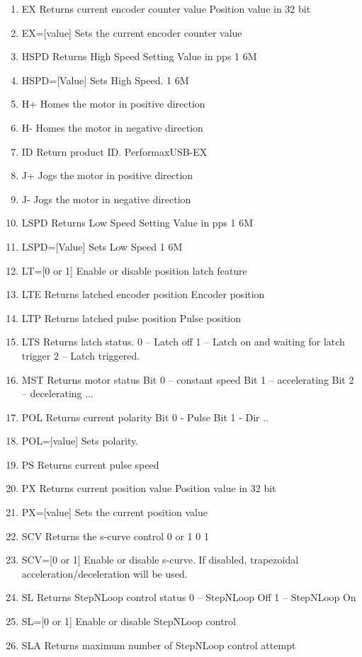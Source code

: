 \documentclass[10pt,letter,twoside]{report}
\begin{document}
\begin{itemize}
\begin{enumerate}
\item EX	Returns current encoder counter value	Position value in 32 bit 		
\item EX=[value]	Sets the current encoder counter value			
\item HSPD	Returns High Speed Setting	Value in pps	1	6M
\item HSPD=[Value] 	Sets High Speed.		1	6M
\item H+	Homes the motor in positive direction			
\item H-	Homes the motor in negative direction			
\item ID	Return product ID. 	PerformaxUSB-EX		
\item J+	Jogs the motor in positive direction			
\item J-	Jogs the motor in negative direction			
\item LSPD	Returns Low Speed Setting	Value in pps	1	6M
\item LSPD=[Value] 	Sets Low Speed		1	6M
\item LT=[0 or 1]	Enable or disable position latch feature			
\item LTE	Returns latched encoder position	Encoder position		
\item LTP	Returns latched pulse position	Pulse position		
\item LTS	Returns latch status.	0 – Latch off 1 – Latch on and waiting for latch trigger 2 – Latch triggered.		
\item MST	Returns motor status	Bit 0 – constant speed Bit 1 – accelerating Bit 2 – decelerating ...
\item POL	Returns current polarity	Bit 0 - Pulse Bit 1 - Dir  ..
\item POL=[value]	Sets polarity.			
\item PS	Returns current pulse speed			
\item PX	Returns current position value	Position value in 32 bit 		
\item PX=[value]	Sets the current position value			
\item SCV	Returns the s-curve control	0 or 1	0	1
\item SCV=[0 or 1]	Enable or disable s-curve.  If disabled, trapezoidal acceleration/deceleration will be used.			
\item SL	Returns StepNLoop control status	0 – StepNLoop Off  1 – StepNLoop On		
\item SL=[0 or 1]	Enable or disable StepNLoop control			
\item SLA	Returns maximum number of StepNLoop control attempt			

\end{enumerate}
\end{itemize}
\end{document}
